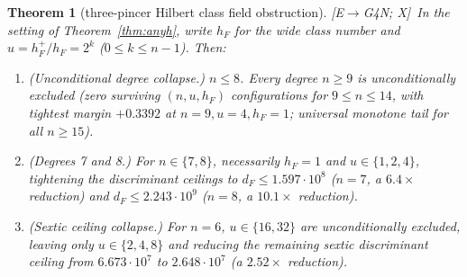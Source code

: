 \documentclass[11pt]{amsart}
\numberwithin{equation}{section}
\theoremstyle{plain}
\newtheorem{theorem}{Theorem}[section]
\theoremstyle{definition}\newtheorem{definition}[theorem]{Definition}
\theoremstyle{remark}\newtheorem{remark}[theorem]{Remark}
\newcommand{\ctag}[1]{\textup{\textsf{\scriptsize[#1]}}}
\begin{document}
\begin{theorem}[three-pincer Hilbert class field obstruction]\label{thm:threepincer}
\ctag{E$\to$G4N; X}\ In the setting of Theorem~\ref{thm:anyh}, write $h_F$ for the wide class number and $u=h_F^+/h_F=2^k$ ($0\le k\le n-1$). Then:
\begin{enumerate}[label=(\alph*),nosep]
\item \emph{(Unconditional degree collapse.)} $n\le8$. Every degree $n\ge9$ is unconditionally excluded (zero surviving $(n,u,h_F)$ configurations for $9\le n\le14$, with tightest margin $+0.3392$ at $n=9,u=4,h_F=1$; universal monotone tail for all $n\ge15$).
\item \emph{(Degrees 7 and 8.)} For $n\in\{7,8\}$, necessarily $h_F=1$ and $u\in\{1,2,4\}$, tightening the discriminant ceilings to $d_F\le1.597\cdot10^8$ ($n=7$, a $6.4\times$ reduction) and $d_F\le2.243\cdot10^9$ ($n=8$, a $10.1\times$ reduction).
\item \emph{(Sextic ceiling collapse.)} For $n=6$, $u\in\{16,32\}$ are unconditionally excluded, leaving only $u\in\{2,4,8\}$ and reducing the remaining sextic discriminant ceiling from $6.673\cdot10^7$ to $2.648\cdot10^7$ (a $2.52\times$ reduction).
\end{enumerate}
\end{theorem}
\end{document}

